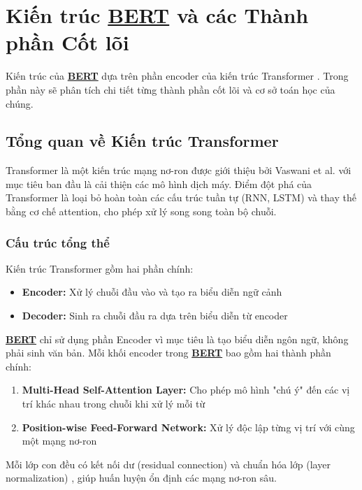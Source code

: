 \section{Kiến trúc \hyperref[acro:bert]{\textbf{BERT}} và các Thành phần Cốt lõi}
\label{sec:kien_truc_bert}

Kiến trúc của \hyperref[acro:bert]{\textbf{BERT}} dựa trên phần encoder của kiến trúc Transformer \cite{vaswani2017attention}. Trong phần này sẽ phân tích chi tiết từng thành phần cốt lõi và cơ sở toán học của chúng.

\subsection{Tổng quan về Kiến trúc Transformer}
\label{ssec:tong_quan_transformer}

Transformer là một kiến trúc mạng nơ-ron được giới thiệu bởi Vaswani et al. \cite{vaswani2017attention} với mục tiêu ban đầu là cải thiện các mô hình dịch máy. Điểm đột phá của Transformer là loại bỏ hoàn toàn các cấu trúc tuần tự (RNN, LSTM) và thay thế bằng cơ chế attention, cho phép xử lý song song toàn bộ chuỗi.

\subsubsection{Cấu trúc tổng thể}
Kiến trúc Transformer gồm hai phần chính:
\begin{itemize}
    \item \textbf{Encoder:} Xử lý chuỗi đầu vào và tạo ra biểu diễn ngữ cảnh
    \item \textbf{Decoder:} Sinh ra chuỗi đầu ra dựa trên biểu diễn từ encoder
\end{itemize}

\hyperref[acro:bert]{\textbf{BERT}} chỉ sử dụng phần Encoder vì mục tiêu là tạo biểu diễn ngôn ngữ, không phải sinh văn bản. Mỗi khối encoder trong \hyperref[acro:bert]{\textbf{BERT}} bao gồm hai thành phần chính:

\begin{enumerate}
    \item \textbf{Multi-Head Self-Attention Layer:} Cho phép mô hình "chú ý" đến các vị trí khác nhau trong chuỗi khi xử lý mỗi từ
    \item \textbf{Position-wise Feed-Forward Network:} Xử lý độc lập từng vị trí với cùng một mạng nơ-ron
\end{enumerate}

Mỗi lớp con đều có kết nối dư (residual connection) và chuẩn hóa lớp (layer normalization) \cite{ba2016layer}, giúp huấn luyện ổn định các mạng nơ-ron sâu.

